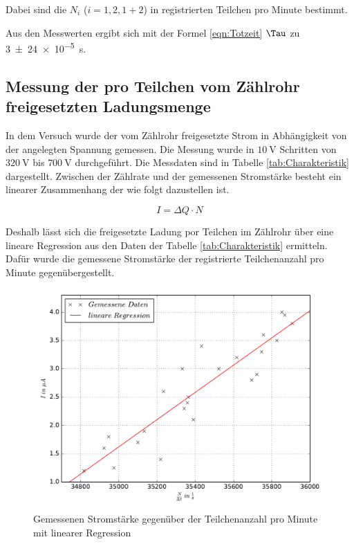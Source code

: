 Dabei sind die $N_i$ ($i = 1, 2, 1+2$) in registrierten Teilchen pro Minute bestimmt.

Aus den Messwerten ergibt sich mit der Formel \eqref{eqn:Totzeit}
$\Tau$ zu \SI{3(24)e-5}{\second}.

\subsection{Messung der pro Teilchen vom Zählrohr freigesetzten Ladungsmenge}

In dem Versuch wurde der vom Zählrohr freigesetzte Strom
in Abhängigkeit von der angelegten Spannung gemessen.
Die Messung wurde in $\SI{10}{\volt}$ Schritten von
$\SI{320}{\volt}$ bis $\SI{700}{\volt}$ durchgeführt.
Die Messdaten sind in Tabelle \ref{tab:Charakteristik} dargestellt.
Zwischen der Zählrate und der gemessenen Stromstärke besteht ein
linearer Zusammenhang der wie folgt dazustellen ist.

\begin{equation*}
  I = \Delta Q \cdot N
\end{equation*}

Deshalb lässt sich die freigesetzte Ladung por Teilchen im Zählrohr über eine
lineare Regression aus den Daten der Tabelle \ref{tab:Charakteristik} ermitteln.
Dafür wurde die gemessene Stromstärke der registrierte Teilchenanzahl pro Minute
gegenübergestellt.

\begin{figure}
  \centering
  \includegraphics[width=\textwidth]{Stromstärke_gegen_Anzahl.pdf}
  \caption{Gemessenen Stromstärke gegenüber der Teilchenanzahl pro Minute mit linearer Regression}
  \label{fig:Stromstärke_gegen_Anzahl}
\end{figure}

